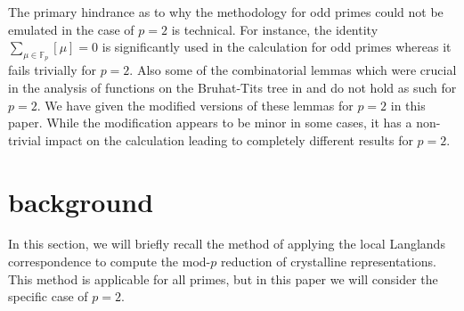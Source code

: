 \documentclass[11pt, reqno]{amsart}
\numberwithin{equation}{section}
\newcommand\N{\mathbb{N}}
\newcommand{\F}{\mathbb{F}}
\newtheorem{lemma}[thm]{Lemma}
\theoremstyle{definition}
\theoremstyle{remark}
\theoremstyle{definition}
\theoremstyle{remark}
\theoremstyle{remark}
\begin{document}
The primary hindrance as to why the methodology for odd primes could not be emulated in the case of $p=2$ is technical. For instance, the identity $\displaystyle\sum_{\mu \in \F_{p}}[\mu]=0$ is significantly used in the calculation for odd primes whereas it fails trivially for $p=2$. Also some of the combinatorial lemmas which were crucial in the analysis of functions on the Bruhat-Tits tree in \cite{Buzzard-Gee13} and \cite{Bhattacharya-Ghate-Rozensztajn18} do not hold as such for $p=2$. We have given the modified versions of these lemmas for $p=2$ in this paper. While the modification appears to be minor in some cases, it has a non-trivial impact on the calculation leading to completely different results for $p=2$. 




        
\section{background}
In this section, we will briefly recall the method of applying the local Langlands correspondence to compute the mod-$p$ reduction of crystalline representations. This method is applicable for all primes, but in this paper we will consider the specific case of $p=2$.%
\end{document}
